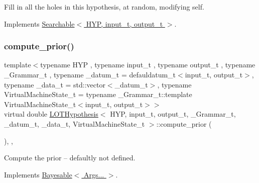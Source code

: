Fill in all the holes in this hypothesis, at random, modifying self. 



Implements \hyperlink{class_searchable_a3ae6263b49a0f9da94f5dcc23af6618e}{Searchable$<$ H\+Y\+P, input\+\_\+t, output\+\_\+t $>$}.

\mbox{\label{class_l_o_t_hypothesis_af215c4833e81984364703b2e4cb78dc7}} 
\subsubsection{\texorpdfstring{compute\+\_\+prior()}{compute\_prior()}}
{\footnotesize\ttfamily template$<$typename H\+YP , typename input\+\_\+t , typename output\+\_\+t , typename \+\_\+\+Grammar\+\_\+t , typename \+\_\+datum\+\_\+t  = defauldatum\+\_\+t$<$input\+\_\+t, output\+\_\+t$>$, typename \+\_\+data\+\_\+t  = std\+::vector$<$\+\_\+datum\+\_\+t$>$, typename Virtual\+Machine\+State\+\_\+t  = typename \+\_\+\+Grammar\+\_\+t\+::template Virtual\+Machine\+State\+\_\+t$<$input\+\_\+t, output\+\_\+t$>$$>$ \\
virtual double \hyperlink{class_l_o_t_hypothesis}{L\+O\+T\+Hypothesis}$<$ H\+YP, input\+\_\+t, output\+\_\+t, \+\_\+\+Grammar\+\_\+t, \+\_\+datum\+\_\+t, \+\_\+data\+\_\+t, Virtual\+Machine\+State\+\_\+t $>$\+::compute\+\_\+prior (\begin{DoxyParamCaption}{ }\end{DoxyParamCaption})\hspace{0.3cm}{\ttfamily [inline]}, {\ttfamily [override]}, {\ttfamily [virtual]}}



Compute the prior -- defaultly not defined. 



Implements \hyperlink{class_bayesable_a1b057a17212ced123545133e2297c01b}{Bayesable$<$ Args... $>$}.

\mbox{\label{class_l_o_t_hypothesis_a0ff11e5e328fcfa819a8dd9b5d57bd65}} 
